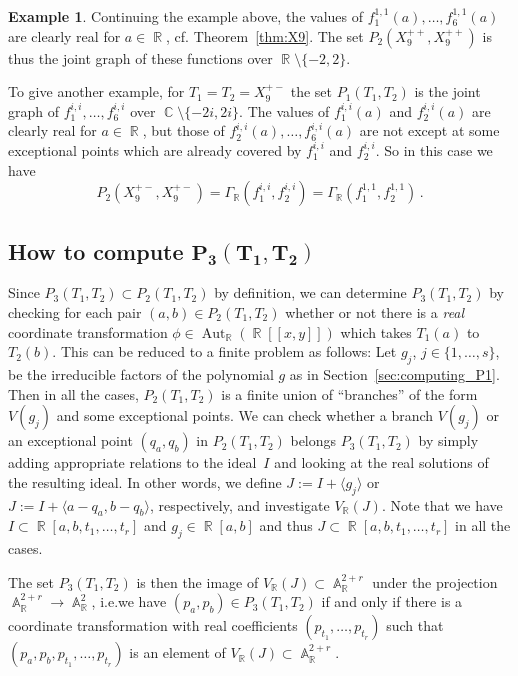 \documentclass[noend]{amsproc}
\theoremstyle{definition}
\newtheorem{example}[theorem]{Example}
\DeclareMathOperator{\R}{\mathbb{R}}
\DeclareMathOperator{\C}{\mathbb{C}}
\DeclareMathOperator{\A}{\mathbb{A}}
\DeclareMathOperator{\Aut}{Aut}
\begin{document}
\begin{example}\label{ex:P2}
Continuing the example above, the values of
$f_1^{1,1}(a), \ldots, f_6^{1,1}(a)$ are clearly real for $a \in \R$, cf.\@
Theorem~\ref{thm:X9}. The set $P_2(X_9^{++}, X_9^{++})$ is thus the joint graph
of these functions over $\R \setminus \{-2, 2\}$.

To give another example, for $T_1 = T_2 = X_9^{+-}$ the set $P_1(T_1, T_2)$ is
the joint graph of $f_1^{i,i}, \ldots, f_6^{i,i}$ over
$\C \setminus \{-2i, 2i\}$. The values of $f_1^{i,i}(a)$ and $f_2^{i,i}(a)$ are
clearly real for $a \in \R$, but those of $f_2^{i,i}(a), \ldots, f_6^{i,i}(a)$
are not except at some exceptional points which are already covered by
$f_1^{i,i}$ and $f_2^{i,i}$. So in this case we have
\[
P_2(X_9^{+-}, X_9^{+-}) = \Gamma_{\R} \left(f_1^{i,i}, f_2^{i,i}\right)
= \Gamma_{\R} \left(f_1^{1,1}, f_2^{1,1}\right) \,.
\]
\end{example}


\subsection{How to compute $\boldsymbol{P_3(T_1, T_2)}$}

Since $P_3(T_1, T_2) \subset P_2(T_1, T_2)$ by definition, we can determine
$P_3(T_1, T_2)$ by checking for each pair $(a,b) \in P_2(T_1, T_2)$ whether or
not there is a \emph{real} coordinate transformation
$\phi \in \Aut_{\R}(\R[[x,y]])$ which takes $T_1(a)$ to $T_2(b)$. This can be
reduced to a finite problem as follows: Let $g_j$, $j \in \{1,\ldots,s\}$, be
the irreducible factors of the polynomial $g$ as in
Section~\ref{sec:computing_P1}. Then in all the cases, $P_2(T_1, T_2)$ is a
finite union of ``branches'' of the form $V(g_j)$ and some exceptional points.
We can check whether a branch $V(g_j)$ or an exceptional point $(q_a, q_b)$ in
$P_2(T_1, T_2)$ belongs $P_3(T_1, T_2)$ by simply adding appropriate relations
to the ideal~$I$ and looking at the real solutions of the resulting ideal. In
other words, we define $J := I+\langle g_j \rangle$ or
$J := I+\langle a-q_a, b-q_b \rangle$, respectively, and investigate
$V_{\R}(J)$. Note that we have $I \subset \R[a,b,t_1,\ldots,t_r]$ and
$g_j \in \R[a,b]$ and thus $J \subset \R[a,b,t_1,\ldots,t_r]$ in all the cases.

The set $P_3(T_1, T_2)$ is then the image of $V_{\R}(J) \subset \A_{\R}^{2+r}$
under the projection $\A_{\R}^{2+r} \rightarrow \A_{\R}^2$, i.e.\@ we have
$(p_a, p_b) \in P_3(T_1, T_2)$ if and only if there is a coordinate
transformation with real coefficients $(p_{t_1}, \ldots, p_{t_r})$ such that
$(p_a, p_b, p_{t_1}, \ldots, p_{t_r})$ is an element of
$V_{\R}(J) \subset \A_{\R}^{2+r}$.
\end{document}
